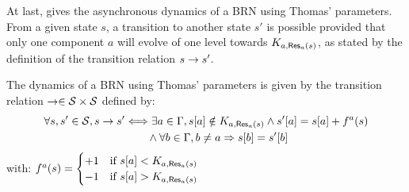 At last,  gives the asynchronous dynamics of a BRN using Thomas' parameters.
From a given state $s$, a transition to another state $s'$ is possible provided that only one component $a$ will evolve of one level towards $K_{a,\mathsf{Res}_{a}(s)}$,
as stated by the definition of the transition relation $s \rightarrow s'$.


\begin{definition}\label{def:dynamics}
The dynamics of a BRN using Thomas' parameters is given by the transition relation $\rightarrow \in \mathcal{S} \times \mathcal{S}$ defined by:
\begin{align*}
  \forall s, s' \in \mathcal{S}, s \rightarrow s' &\Longleftrightarrow \exists a \in \Gamma, {s[a]} \notin K_{a, \mathsf{Res}_{a}(s)} \wedge {s'[a]} = {s[a]} + f^a(s) \\
    & \qquad \wedge \forall b \in \Gamma, b \neq a \Rightarrow {s[b]} = {s'[b]}
\end{align*}
with: $f^a(s) = 
  \begin{cases}
    +1 & \text{if } {s[a]} < K_{a, \mathsf{Res}_{a}(s)} \\
    -1 & \text{if } {s[a]} > K_{a, \mathsf{Res}_{a}(s)} \\
  \end{cases}$
\begin{comment}
Let $s$ be a state of a BRN using Thomas' parameters $(\IG, K)$ where $\IG = (\Gamma, E_+, E_-)$.
The state that succeeds to $s$ is given by the indeterministic function $f(s)$:
\begin{align*}
  f(s)  & = s' \Leftrightarrow \exists a \in \Gamma,
    \GRNget{s'}{a} = f^a(s) \wedge
    \forall b \in \Gamma, b \neq a, \GRNget{s}{b} = \GRNget{s'}{b}
    \quad\text{, with}\\
  f^a(s) & =
  \begin{cases}
    \GRNget{s}{a} + 1 & \text{if } \GRNget{s}{a} < K_{a,A,B} \\%
    \GRNget{s}{a} & \text{if } \GRNget{s}{a} \in K_{a,A,B} \\ %
    \GRNget{s}{a} - 1 & \text{if } \GRNget{s}{a} > K_{a,A,B} %
  \end{cases}
\quad\text{, where $A,B=\GRNres{a}{s}$.}
\end{align*}
\end{comment}
\end{definition}

